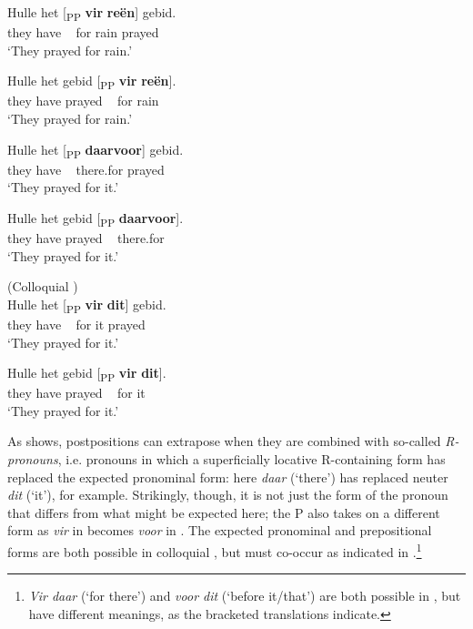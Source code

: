 \documentclass[output=paper]{LSP/langsci}
\begin{document}
\ea%
    \label{ex:biberauer:37} 
\ea
\gll  Hulle het    [\textsubscript{PP}  \textbf{vir} \textbf{reën}] gebid.\\
     they   have   ~     for rain    prayed\\
   \glt ‘They prayed for rain.’

  \ex  
\gll Hulle het    gebid [\textsubscript{PP}  \textbf{vir} \textbf{reën}]. \\
    they   have prayed  ~    for rain\\
  \glt ‘They prayed for rain.’
\z
\z

\ea\label{ex:biberauer:38}
 \ea  \label{ex:biberauer:38a}
\gll Hulle het    [\textsubscript{PP}  \textbf{daarvoor}] gebid.\\
     they   have   ~    there.for     prayed\\
   \glt ‘They prayed for it.’

  \ex    \label{ex:biberauer:38b}
\gll Hulle het    gebid   [\textsubscript{PP}  \textbf{daarvoor}]. \\
 they   have prayed   ~     there.for\\
  \glt ‘They prayed for it.’
\z
\z

\ea%
    \label{ex:biberauer:39}
\ea (Colloquial )\\
\gll Hulle het [\textsubscript{PP} \textbf{vir} \textbf{dit}] gebid. \\
    they have ~ for it prayed\\
  \glt ‘They prayed for it.’

 \ex
\gll  Hulle het    gebid [\textsubscript{PP} \textbf{vir} \textbf{dit}].\\
    they   have prayed   ~  for it\\
  \glt ‘They prayed for it.’ 
\z
\z

As  shows, postpositions can extrapose when they are combined with so-called \textit{R-pronouns}, i.e. pronouns in which a superficially locative R-containing form has replaced the expected pronominal form: here \textit{daar} (‘there’) has replaced neuter \textit{dit} (‘it’), for example. Strikingly, though, it is not just the form of the pronoun that differs from what might be expected here; the P also takes on a different form as \textit{vir} in  becomes \textit{voor} in . The expected pronominal and prepositional forms are both possible in colloquial , but must co-occur as indicated in .\footnote{\textit{Vir daar} (‘for there’) and \textit{voor dit} (‘before it/that’) are both possible in , but have different meanings, as the bracketed translations indicate.} 
\end{document}
